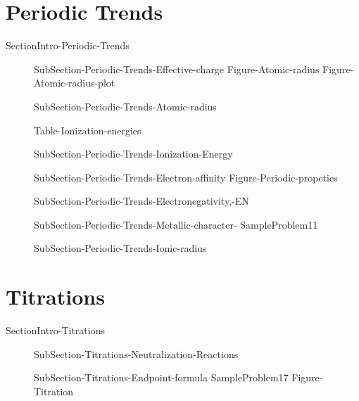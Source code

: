 \documentclass[main.tex]{subfiles}
\newcommand\chapterlabel{ChMIX-biomoleculesinsolution}\setcounter{figurenewcounter}{0}\setcounter{tablenewcounter}{0}\setcounter{formulanewcounter}{0}
\begin{document}
\newpage
\section{\faTint  Periodic Trends}{SectionIntro-Periodic-Trends}
\sloppy\begin{description}
\item[] {SubSection-Periodic-Trends-Effective-charge}
   {Figure-Atomic-radius}
{Figure-Atomic-radius-plot}
\item[] {SubSection-Periodic-Trends-Atomic-radius}
\begin{fullwidth}{Table-Ionization-energies}\end{fullwidth}\newpage
\item[] {SubSection-Periodic-Trends-Ionization-Energy}
\item[] {SubSection-Periodic-Trends-Electron-affinity}
\hspace{-6cm}  {Figure-Periodic-propeties}
\item[] {SubSection-Periodic-Trends-Electronegativity,-EN}
\item[]{SubSection-Periodic-Trends-Metallic-character-}
  {SampleProblem11}
\item[]  {SubSection-Periodic-Trends-Ionic-radius}
\end{description}

\renewcommand\chapterlabel{Ch-acidbase}
\section{\faFlask Titrations}{SectionIntro-Titrations}
\sloppy \begin{description}
\item[] {SubSection-Titrations-Neutralization-Reactions}
\item[] {SubSection-Titrations-Endpoint-formula}
  {SampleProblem17}
    {Figure-Titration}

\end{description}
\end{document}
